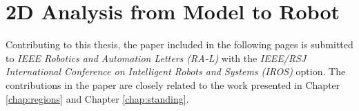 %
\chapter{2D Analysis from Model to Robot}
Contributing to this thesis, the paper included in the following pages is submitted to \textit{IEEE Robotics and Automation Letters (RA-L)} with the \textit{IEEE/RSJ International Conference on Intelligent Robots and Systems (IROS)} option. The contributions in the paper are closely related to the work presented in Chapter \ref{chap:regions} and Chapter \ref{chap:standing}.



